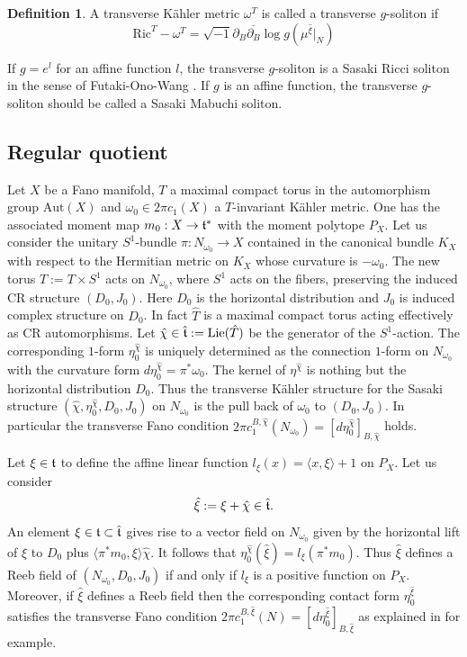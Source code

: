 \documentclass[12pt]{amsart}
\numberwithin{equation}{section}%
\theoremstyle{plain}
\theoremstyle{definition}
\newtheorem{definition}[theorem]{Definition}
\newcommand{\deldelb}{\sqrt{-1}\partial_{B} \overline{\partial_{B}}}
\newcommand{\Ric}{\mathrm{Ric}}
\newcommand{\1}{\mathbf{1}}
\begin{document}
\begin{definition}
A transverse K\"ahler metric $\omega^{T}$ is called a transverse
$g$-soliton if
\begin{equation}
\Ric^{T}-\omega^{T}=\deldelb \log g(\mu^{\hat{\xi}}|_{N})
\end{equation}
\end{definition}

If $g=e^{l}$ for an affine function $l$, the transverse $g$-soliton
is a Sasaki Ricci soliton in the sense of Futaki-Ono-Wang \cite{FOW09}.
If $g$ is an affine function, the transverse $g$-soliton
should be called a Sasaki Mabuchi soliton.
\subsection{Regular quotient}
Let $X$ be a Fano manifold, $T$ a maximal compact torus
in the automorphism group $\mathrm{Aut}(X)$
and $\omega_{0}\in 2\pi c_{1}(X)$ a $T$-invariant K\"ahler metric.
One has the associated moment map $m_{0}:X\to\frak{t}^{*}$ with
the moment polytope $P_{X}$.
Let us consider the unitary $S^{1}$-bundle 
$\pi : N_{\omega_{0}}\to X$ contained in the canonical bundle $K_{X}$
with respect to the Hermitian metric on $K_{X}$
whose curvature is $-\omega_{0}$.
The new torus $\hat{T}:=T\times S^{1}$ acts on $N_{\omega_{0}}$,
where $S^{1}$ acts on the fibers,
preserving the induced CR structure $(D_{0}, J_{0})$.
Here $D_{0}$ is the horizontal distribution
and $J_{0}$ is induced complex structure on $D_{0}$.
In fact $\hat{T}$ is a maximal compact torus acting effectively
as CR automorphisms.
Let $\hat{\chi}\in\hat{\frak{t}}:=\mathrm{Lie}(\hat{T})$
be the generator of the $S^{1}$-action.
The corresponding $1$-form $\eta_{0}^{\hat{\chi}}$ is uniquely determined
as the connection $1$-form on $N_{\omega_{0}}$ with the curvature form
$d\eta_{0}^{\hat{\chi}}=\pi^{*}\omega_{0}$.
The kernel of $\eta^{\hat{\chi}}$ is nothing but the horizontal distribution $D_{0}$.
Thus the transverse K\"ahler structure for the Sasaki structure
$(\hat{\chi}, \eta_{0}^{\hat{\chi}}, D_{0},J_{0})$ on $N_{\omega_{0}}$
is the pull back of $\omega_{0}$ to $(D_{0},J_{0})$.
In particular the transverse Fano condition
$2\pi c^{B,\hat{\chi}}_{1}(N_{\omega_{0}})
=[d\eta_{0}^{\hat{\chi}}]_{B,\hat{\chi}}$ holds.

Let $\xi\in\frak{t}$ to define the affine linear function
$l_{\xi}(x)=\langle x,\xi \rangle +1$ on $P_{X}$.
Let us consider
\begin{equation}
\hat{\xi}:=\xi+\hat{\chi}\in\hat{\frak{t}}.
\end{equation}
An element $\xi\in\frak{t}\subset\hat{\frak{t}}$ gives rise to a vector field on $N_{\omega_{0}}$
given by the horizontal lift of $\xi$ to $D_{0}$ plus
$\langle \pi^{*}m_{0},\xi\rangle\hat{\chi}$.
It follows that $\eta_{0}^{\hat{\chi}}(\hat{\xi})=l_{\xi}(\pi^{*}m_{0})$.
Thus $\hat{\xi}$ defines a Reeb field of $(N_{\omega_{0}},D_{0},J_{0})$
if and only if $l_{\xi}$ is a positive function on $P_{X}$.
Moreover, if $\hat{\xi}$ defines a Reeb field
then the corresponding contact form $\eta_{0}^{\hat{\xi}}$
satisfies the transverse Fano condition
$2\pi c^{B,\hat{\xi}}_{1}(N)=[d\eta_{0}^{\hat{\xi}}]_{B,\hat{\xi}}$
as explained in \cite[Section 4.6]{ALL25} for example.
\end{document}
